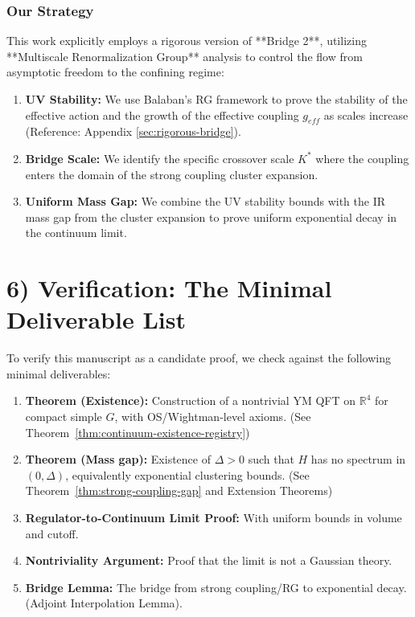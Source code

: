\subsubsection*{Our Strategy}
This work explicitly employs a rigorous version of **Bridge 2**, utilizing **Multiscale Renormalization Group** analysis to control the flow from asymptotic freedom to the confining regime:
\begin{enumerate}
    \item \textbf{UV Stability:} We use Balaban's RG framework to prove the stability of the effective action and the growth of the effective coupling $g_{eff}$ as scales increase (Reference: Appendix \ref{sec:rigorous-bridge}).
    \item \textbf{Bridge Scale:} We identify the specific crossover scale $K^*$ where the coupling enters the domain of the strong coupling cluster expansion.
    \item \textbf{Uniform Mass Gap:} We combine the UV stability bounds with the IR mass gap from the cluster expansion to prove uniform exponential decay in the continuum limit.
\end{enumerate}

\section{6) Verification: The Minimal Deliverable List}

To verify this manuscript as a candidate proof, we check against the following minimal deliverables:

\begin{enumerate}
    \item \textbf{Theorem (Existence):} Construction of a nontrivial YM QFT on $\mathbb{R}^4$ for compact simple $G$, with OS/Wightman-level axioms. (See Theorem~\ref{thm:continuum-existence-registry})
    \item \textbf{Theorem (Mass gap):} Existence of $\Delta > 0$ such that $H$ has no spectrum in $(0,\Delta)$, equivalently exponential clustering bounds. (See Theorem~\ref{thm:strong-coupling-gap} and Extension Theorems)
    \item \textbf{Regulator-to-Continuum Limit Proof:} With uniform bounds in volume and cutoff.
    \item \textbf{Nontriviality Argument:} Proof that the limit is not a Gaussian theory.
    \item \textbf{Bridge Lemma:} The bridge from strong coupling/RG to exponential decay. (Adjoint Interpolation Lemma).
\end{enumerate}
